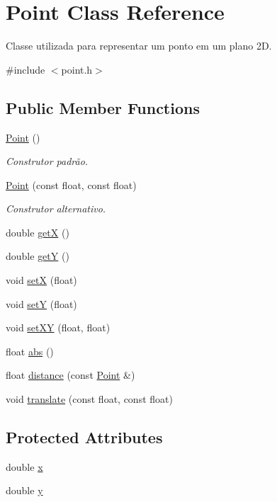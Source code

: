 \hypertarget{class_point}{}\section{Point Class Reference}
\label{class_point}


Classe utilizada para representar um ponto em um plano 2D.  




{\ttfamily \#include $<$point.\+h$>$}

\subsection*{Public Member Functions}
\begin{DoxyCompactItemize}
\item 
\hyperlink{class_point_ad92f2337b839a94ce97dcdb439b4325a}{Point} ()
\begin{DoxyCompactList}\small\item\em Construtor padrão. \end{DoxyCompactList}\item 
\hyperlink{class_point_a2bb66002bdd155f2e20ae8e1e55f5c97}{Point} (const float, const float)
\begin{DoxyCompactList}\small\item\em Construtor alternativo. \end{DoxyCompactList}\item 
double \hyperlink{class_point_a8de35a6098cdd7267b4167776da83da6}{getX} ()
\item 
double \hyperlink{class_point_aa278c8bcb8aeb4101023a4baf473b547}{getY} ()
\item 
void \hyperlink{class_point_a61253b28283b54a9cf379132bdff3006}{setX} (float)
\item 
void \hyperlink{class_point_a0a9d3529888cd2fd7c0adb8e46702110}{setY} (float)
\item 
void \hyperlink{class_point_ae456513d2af9dec336514a94e350a386}{set\+XY} (float, float)
\item 
float \hyperlink{class_point_af6595756d7687bf3a324227cbbe2a531}{abs} ()
\item 
float \hyperlink{class_point_a91600d1914ae912e8d9fb9da62feb1bd}{distance} (const \hyperlink{class_point}{Point} \&)
\item 
void \hyperlink{class_point_a2b103de4d519cd01c9864167e12d2c7f}{translate} (const float, const float)
\end{DoxyCompactItemize}
\subsection*{Protected Attributes}
\begin{DoxyCompactItemize}
\item 
double \hyperlink{class_point_ab99c56589bc8ad5fa5071387110a5bc7}{x}
\item 
double \hyperlink{class_point_afa38be143ae800e6ad69ce8ed4df62d8}{y}
\end{DoxyCompactItemize}
